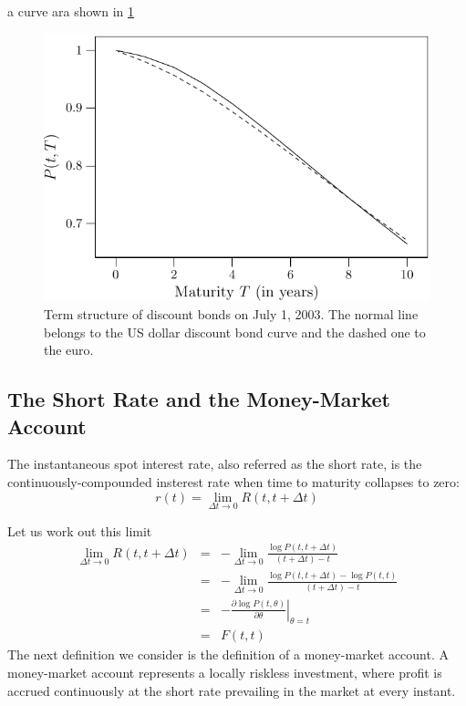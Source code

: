 a curve ara shown in \ref{fig:DiscCurve}
\begin{figure}[!h]
\centering
\includegraphics{Ch1Figure2.pdf}
\caption{Term structure of discount bonds on July 1, 2003. The
  normal line belongs to the US dollar discount bond curve and the
  dashed one to the euro.\label{fig:DiscCurve}}   
\end{figure}

\subsection{The Short Rate and the Money-Market Account}
\begin{defn}
The instantaneous spot interest rate, also referred as the short rate,
is the continuously-compounded insterest rate when time to maturity
collapses to zero: 
\begin{equation}
\label{eq:SRLimitDef}
r(t)=\lim_{\Delta t \to 0} R(t,t+\Delta t)
\end{equation}
\end{defn}
Let us work out this limit
\begin{equation}
\label{eq:SRForwrdDef}
\begin{array}{rcl}
\displaystyle \lim_{\Delta t\to 0} R(t,t+\Delta t) & = &
-\displaystyle \lim_{\Delta t\to 0} \displaystyle \frac{\log
  P(t,t+\Delta t)}{(t+\Delta t)-t} \\  
 & = & -\displaystyle \lim_{\Delta t\to 0} \frac{\log P(t,t+\Delta
   t)-\log P(t,t)}{(t+\Delta t)-t} \\
 & = & -\displaystyle \left. \frac{\partial \log P(t,\theta)}{\partial
     \theta} \right|_{\theta=t} \\
 & = & F(t,t)
\end{array}
\end{equation}
The next definition we consider is the definition of a money-market
account. A money-market account represents a locally riskless
investment, where profit is accrued continuously at the short rate
prevailing in the market at every instant.  


